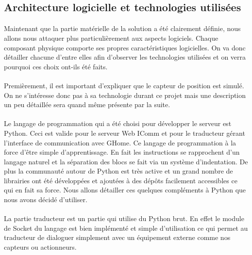 \subsection{Architecture logicielle et technologies utilisées}

\paragraph{}
Maintenant que la partie matérielle de la solution a été clairement définie, nous allons nous attaquer plus particulièrement aux aspects logiciels. Chaque composant physique comporte ses propres caractéristiques logicielles. On va donc détailler chacune d'entre elles afin d'observer les technologies utilisées et on verra pourquoi ces choix ont-ils été faits.

\paragraph{}
Premièrement, il est important d'expliquer que le capteur de position est simulé. On ne s'intéresse donc pas à sa technologie durant ce projet mais une description un peu détaillée sera quand même présente par la suite.

\paragraph{}
Le langage de programmation qui a été choisi pour développer le serveur est Python. Ceci est valide pour le serveur Web IComm et pour le traducteur gérant l'interface de communication avec GHome. Ce langage de programmation à la force d'être simple d'apprentissage. En fait les instructions se rapprochent d'un langage naturel et la séparation des blocs se fait via un système d'indentation. De plus la communauté autour de Python est très active et un grand nombre de librairies ont été développées et ajoutées à des dépôts facilement accessibles ce qui en fait sa force. Nous allons détailler ces quelques compléments à Python que nous avons décidé d'utiliser.

\paragraph{}
La partie traducteur est un partie qui utilise du Python brut. En effet le module de Socket du langage est bien implémenté et simple d'utilisation ce qui permet au traducteur de dialoguer simplement avec un équipement externe comme nos capteurs ou actionneurs. 

